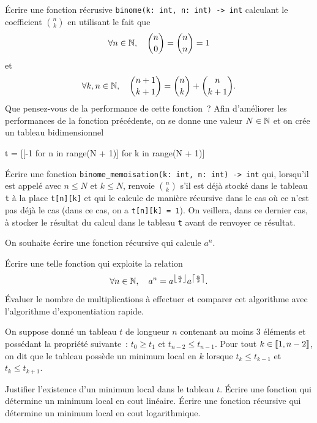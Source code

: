 \documentclass{magnoliaold}
\begin{document}
\begin{questions}
\question
Écrire une fonction récrusive \verb!binome(k: int, n: int) -> int!
calculant le coefficient $\binom{n}{k}$ en utilisant le fait que
\[\forall n\in\mathbb{N},\quad \binom{n}{0}=\binom{n}{n}=1\]
et
\[\forall k,n\in\mathbb{N},\quad \binom{n+1}{k+1}=\binom{n}{k}+\binom{n}{k+1}.\]
Que pensez-vous de la performance de cette fonction~?
\question Afin d'améliorer les performances de la fonction précédente, on se donne
	une valeur $N\in\mathbb{N}$ et on crée un tableau bidimensionnel 
\begin{pythoncode}
t = [[-1 for n in range(N + 1)] for k in range(N + 1)]
\end{pythoncode}
	Écrire une fonction \verb!binome_memoisation(k: int, n: int) -> int! qui,
	lorsqu'il est appelé avec $n\leq N$ et $k\leq N$, 
	renvoie $\binom{n}{k}$ s'il est déjà stocké dans le tableau \verb!t!
	à la place \verb!t[n][k]! et qui le calcule de manière récursive dans
	le cas où ce n'est pas déjà le cas (dans ce cas, on a \verb!t[n][k] = 1!).
	On veillera, dans ce dernier cas, à stocker le résultat du calcul dans
	le tableau \verb!t! avant de renvoyer ce résultat.
\end{questions}

On souhaite écrire une fonction récursive qui calcule $a^n$.
\begin{questions}
\question Écrire une telle fonction qui exploite la relation
  \[\forall n\in\mathbb{N},\quad a^n=a^{\left\lfloor\frac{n}{2}\right\rfloor} a^{\left\lceil\frac{n}{2}\right\rceil}.\]
\question Évaluer le nombre de multiplications à effectuer et comparer cet algorithme avec
  l'algorithme d'exponentiation rapide. 
\end{questions}


On suppose donné un tableau $t$ de longueur $n$ contenant au moins 3 éléments et possédant
la propriété suivante~: $t_0\geq t_1$ et $t_{n-2}\leq t_{n-1}$. Pour tout $k\in\left\llbracket 1,n-2\right\rrbracket$, on dit que le tableau possède un minimum local en $k$ lorsque $t_k\leq t_{k-1}$ et $t_k\leq t_{k+1}$.
\begin{questions}
\question Justifier l'existence d'un minimum local dans le tableau $t$.
\question Écrire une fonction qui détermine un minimum local en cout linéaire.
\question Écrire une fonction récursive qui détermine un minimum local en cout logarithmique.
\end{questions}
\end{document}
